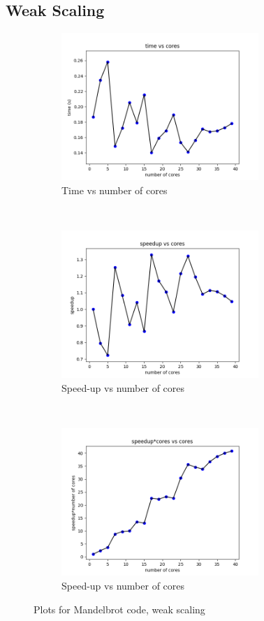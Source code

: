 \documentclass[12pt]{article}
\theoremstyle{plain}
\theoremstyle{definition}
\begin{document}
\subsection{Weak Scaling}
\begin{figure}[t]
    \centering
    \begin{subfigure}[t]{0.5\textwidth}
        \centering
        \includegraphics[height=2.2in]{timeq2_weak.png}
         \caption{Time vs number of cores}
    \end{subfigure}%
    ~
    \begin{subfigure}[t]{0.5\textwidth}
        \centering
        \includegraphics[height=2.2in]{speedupq2_weak.png}
        \caption{Speed-up vs number of cores}
    \end{subfigure}
        ~
    \begin{subfigure}[t]{0.5\textwidth}
        \centering
        \includegraphics[height=2.2in]{speed_coresq2_weak.png}
        \caption{Speed-up vs number of cores}
    \end{subfigure}
    \caption{Plots for Mandelbrot code, weak scaling }
    \label{fig:q2c}
\end{figure}
\end{document}

